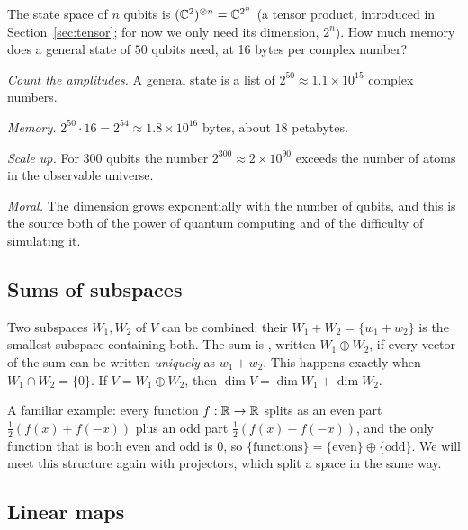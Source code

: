 \begin{example}\label{ex:nqubits}
  The state space of $n$ qubits is $(\mathbb{C}^2)^{\otimes n}=\mathbb{C}^{2^n}$ (a tensor product, introduced in Section~\ref{sec:tensor}; for now we only need its dimension, $2^n$). How much memory does a general state of $50$ qubits need, at 16 bytes per complex number?
\end{example}
\begin{solution}
  \begin{steps}
    \item \emph{Count the amplitudes.} A general state is a list of $2^{50}\approx1.1\times10^{15}$ complex numbers.
    \item \emph{Memory.} $2^{50}\cdot16=2^{54}\approx1.8\times10^{16}$ bytes, about $18$ petabytes.
    \item \emph{Scale up.} For $300$ qubits the number $2^{300}\approx2\times10^{90}$ exceeds the number of atoms in the observable universe.
    \item \emph{Moral.} The dimension grows exponentially with the number of qubits, and this is the source both of the power of quantum computing and of the difficulty of simulating it.
  \end{steps}
\end{solution}

\subsection{Sums of subspaces}

Two subspaces $W_1,W_2$ of $V$ can be combined: their  $W_1+W_2=\{w_1+w_2\}$ is the smallest subspace containing both. The sum is , written $W_1\oplus W_2$, if every vector of the sum can be written \emph{uniquely} as $w_1+w_2$. This happens exactly when $W_1\cap W_2=\{0\}$. If $V=W_1\oplus W_2$, then $\dim V=\dim W_1+\dim W_2$.

A familiar example: every function $f:\mathbb{R}\to\mathbb{R}$ splits as an even part $\tfrac12(f(x)+f(-x))$ plus an odd part $\tfrac12(f(x)-f(-x))$, and the only function that is both even and odd is $0$, so $\{\text{functions}\}=\{\text{even}\}\oplus\{\text{odd}\}$. We will meet this structure again with projectors, which split a space in the same way.

\subsection{Linear maps}

